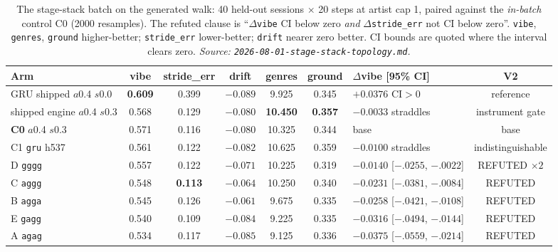 \documentclass[11pt]{article}
\newcommand{\best}[1]{\textbf{#1}}
\begin{document}
\begin{table}[ht]
  \centering
  \caption{The stage-stack batch on the generated walk: \num{40} held-out sessions
  $\times$ \num{20} steps at artist cap 1, paired against the \emph{in-batch}
  control C0 (\num{2000} resamples). The refuted clause is
  ``$\Delta$\texttt{vibe} CI below zero \emph{and} $\Delta$\texttt{stride\_err}
  not CI below zero''. \texttt{vibe}, \texttt{genres}, \texttt{ground}
  higher-better; \texttt{stride\_err} lower-better; \texttt{drift} nearer zero
  better. CI bounds are quoted where the interval clears zero.
  \emph{Source: \texttt{2026-08-01-stage-stack-topology.md}.}}
  \label{tab:nexttrack-stagestack-s2}
  {\footnotesize\setlength{\tabcolsep}{2.6pt}\begin{tabular}{lccccclc}
    \toprule
    Arm & vibe & stride\_err & drift & genres & ground & $\Delta$vibe [95\% CI] & V2 \\
    \midrule
    GRU shipped $a$0.4 $s$0.0 & \best{0.609} & 0.399 & $-0.089$ & 9.925 & 0.345 & $+0.0376$ CI$>$0 & reference \\
    shipped engine $a$0.4 $s$0.3 & 0.568 & 0.129 & $-0.080$ & \best{10.450} & \best{0.357} & $-0.0033$ straddles & instrument gate \\
    \textbf{C0} $a$0.4 $s$0.3 & 0.571 & 0.116 & $-0.080$ & 10.325 & 0.344 & base & base \\
    C1 \texttt{gru} h537 & 0.561 & 0.122 & $-0.082$ & 10.625 & 0.359 & $-0.0100$ straddles & indistinguishable \\
    D \texttt{gggg} & 0.557 & 0.122 & $-0.071$ & 10.225 & 0.319 & $-0.0140$ [$-.0255$, $-.0022$] & REFUTED $\times2$ \\
    C \texttt{aggg} & 0.548 & \best{0.113} & $-0.064$ & 10.250 & 0.340 & $-0.0231$ [$-.0381$, $-.0084$] & REFUTED \\
    B \texttt{agga} & 0.545 & 0.126 & \best{$-0.061$} & 9.675 & 0.335 & $-0.0258$ [$-.0421$, $-.0108$] & REFUTED \\
    E \texttt{gagg} & 0.540 & 0.109 & $-0.084$ & 9.225 & 0.335 & $-0.0316$ [$-.0494$, $-.0144$] & REFUTED \\
    A \texttt{agag} & 0.534 & 0.117 & $-0.085$ & 9.125 & 0.336 & $-0.0375$ [$-.0559$, $-.0214$] & REFUTED \\
    \bottomrule
  \end{tabular}}
\end{table}
\end{document}
